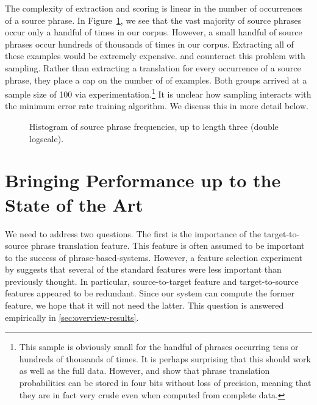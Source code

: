 The complexity of extraction and scoring is linear in the number
of occurrences of a source phrase.  In Figure~\ref{fig:ngram-histogram},
we see that the vast majority of source phrases occur only a handful
of times in our corpus.  However, a small handful of source phrases occur
hundreds of thousands of times in our corpus.  Extracting all of these
examples would be extremely expensive.  \citet{Callison-Burch:2005:acl} and 
\citet{Zhang:2005:eamt} counteract this problem with sampling.
Rather than extracting a translation for every occurrence of a source phrase, they 
place a cap on the number of of examples.  Both groups
arrived at a sample size of 100 via experimentation.\footnote{This sample
is obviously small for the handful of phrases occurring
tens or hundreds of thousands of times.  It is perhaps surprising
that this should work as well as the full data.
However, \citet{Och:2005:wpt} and \citet{Federico:2006:smt} show that 
phrase translation probabilities can be stored in four bits
without loss of precision, meaning that they are in fact very crude
even when computed from complete data.}
It is unclear how sampling interacts with the minimum error 
rate training algorithm.  We discuss this in more detail below.

\figpreamble
\begin{figure}
	\figfontsize{
	\begin{center}
		
	\end{center}}
	\figpostamble
	\caption[Histogram of source phrase frequencies.]{Histogram of source phrase frequencies, up to length three (double logscale).}
	\label{fig:ngram-histogram}
\end{figure}

\section{Bringing Performance up to the State of the Art}\label{sec:getting-to-state-of-the-art}

We need to address two questions.  The first is the importance
of the target-to-source phrase translation feature.  This feature
is often assumed to be important to the success of phrase-based-systems.
However, a feature selection experiment by 
\citet{Lopez:2006:amta} suggests that several of the 
standard features were less important than previously thought.  In 
particular, source-to-target feature and target-to-source features 
appeared to be redundant.  Since our system can compute the former
feature, we hope that it will not need the latter.  This question is
answered empirically in \textsection\ref{sec:overview-results}.

